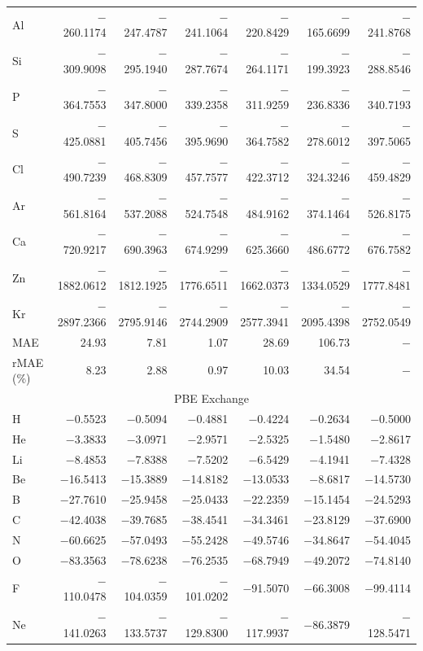 \documentclass[%
 reprint,
 amsmath,amssymb,
 aps,
pra,
]{revtex4-2}
\begin{document}
\begin{table}[t]
\begin{ruledtabular}
\begin{tabular}{lrrrrrr}
Al & $-$260.1174 & $-$247.4787 & $-$241.1064 & $-$220.8429 & $-$165.6699 & $-$241.8768 \\
Si & $-$309.9098 & $-$295.1940 & $-$287.7674 & $-$264.1171 & $-$199.3923 & $-$288.8546 \\
P  & $-$364.7553 & $-$347.8000 & $-$339.2358 & $-$311.9259 & $-$236.8336 & $-$340.7193 \\
S  & $-$425.0881 & $-$405.7456 & $-$395.9690 & $-$364.7582 & $-$278.6012 & $-$397.5065 \\
Cl & $-$490.7239 & $-$468.8309 & $-$457.7577 & $-$422.3712 & $-$324.3246 & $-$459.4829 \\
Ar & $-$561.8164 & $-$537.2088 & $-$524.7548 & $-$484.9162 & $-$374.1464 & $-$526.8175 \\
Ca & $-$720.9217 & $-$690.3963 & $-$674.9299 & $-$625.3660 & $-$486.6772 & $-$676.7582 \\
Zn & $-$1882.0612 & $-$1812.1925 & $-$1776.6511 & $-$1662.0373 & $-$1334.0529 & $-$1777.8481 \\
Kr & $-$2897.2366 & $-$2795.9146 & $-$2744.2909 & $-$2577.3941 & $-$2095.4398 & $-$2752.0549 \\
\hline
MAE & 24.93 & 7.81 & 1.07 & 28.69 & 106.73 & $-$ \\
rMAE (\%) & 8.23 & 2.88 & 0.97 & 10.03 & 34.54 & $-$ \\
\hline
\multicolumn{7}{c}{PBE Exchange} \\
\hline
H  & $-$0.5523 & $-$0.5094 & $-$0.4881 & $-$0.4224 & $-$0.2634 & $-$0.5000 \\
He & $-$3.3833 & $-$3.0971 & $-$2.9571 & $-$2.5325 & $-$1.5480 & $-$2.8617 \\
Li & $-$8.4853 & $-$7.8388 & $-$7.5202 & $-$6.5429 & $-$4.1941 & $-$7.4328 \\
Be & $-$16.5413 & $-$15.3889 & $-$14.8182 & $-$13.0533 & $-$8.6817 & $-$14.5730 \\
B  & $-$27.7610 & $-$25.9458 & $-$25.0433 & $-$22.2359 & $-$15.1454 & $-$24.5293 \\
C  & $-$42.4038 & $-$39.7685 & $-$38.4541 & $-$34.3461 & $-$23.8129 & $-$37.6900 \\
N  & $-$60.6625 & $-$57.0493 & $-$55.2428 & $-$49.5746 & $-$34.8647 & $-$54.4045 \\
O  & $-$83.3563 & $-$78.6238 & $-$76.2535 & $-$68.7949 & $-$49.2072 & $-$74.8140 \\
F  & $-$110.0478 & $-$104.0359 & $-$101.0202 & $-$91.5070 & $-$66.3008 & $-$99.4114 \\
Ne & $-$141.0263 & $-$133.5737 & $-$129.8300 & $-$117.9937 & $-$86.3879 & $-$128.5471 \\

\end{tabular}
\end{ruledtabular}
\end{table}
\end{document}

